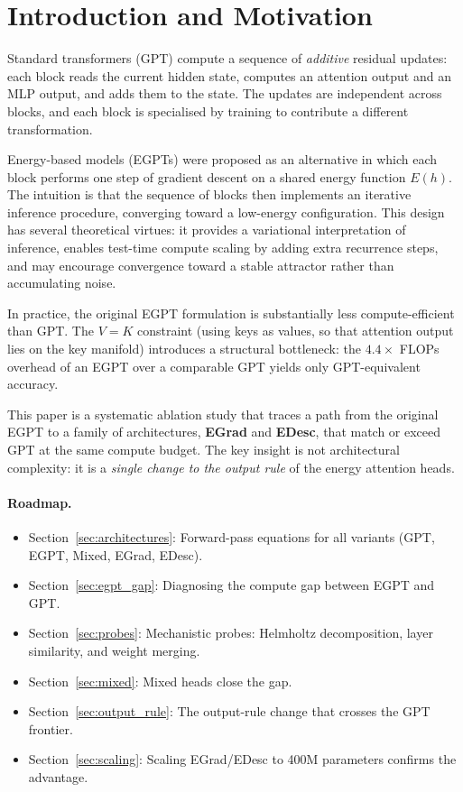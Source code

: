 \section{Introduction and Motivation}
\label{sec:intro}

Standard transformers (GPT) compute a sequence of \emph{additive} residual updates:
each block reads the current hidden state, computes an attention output and an MLP
output, and adds them to the state.
The updates are independent across blocks, and each block is specialised by training
to contribute a different transformation.

Energy-based models (EGPTs) were proposed as an alternative in which each block
performs one step of gradient descent on a shared energy function $E(h)$.
The intuition is that the sequence of blocks then implements an iterative inference
procedure, converging toward a low-energy configuration.
This design has several theoretical virtues: it provides a variational interpretation
of inference, enables test-time compute scaling by adding extra recurrence steps, and
may encourage convergence toward a stable attractor rather than accumulating noise.

In practice, the original EGPT formulation is substantially less compute-efficient than GPT.
The $V{=}K$ constraint (using keys as values, so that attention output lies on the key
manifold) introduces a structural bottleneck: the $4.4\times$ FLOPs overhead of an EGPT
over a comparable GPT yields only GPT-equivalent accuracy.

This paper is a systematic ablation study that traces a path from the original EGPT to
a family of architectures, \textbf{EGrad} and \textbf{EDesc}, that match or exceed GPT at
the same compute budget.
The key insight is not architectural complexity: it is a \emph{single change to the output
rule} of the energy attention heads.

\paragraph{Roadmap.}
\begin{itemize}
  \item Section~\ref{sec:architectures}: Forward-pass equations for all variants (GPT, EGPT, Mixed, EGrad, EDesc).
  \item Section~\ref{sec:egpt_gap}: Diagnosing the compute gap between EGPT and GPT.
  \item Section~\ref{sec:probes}: Mechanistic probes: Helmholtz decomposition, layer similarity, and weight merging.
  \item Section~\ref{sec:mixed}: Mixed heads close the gap.
  \item Section~\ref{sec:output_rule}: The output-rule change that crosses the GPT frontier.
  \item Section~\ref{sec:scaling}: Scaling EGrad/EDesc to 400M parameters confirms the advantage.
\end{itemize}

